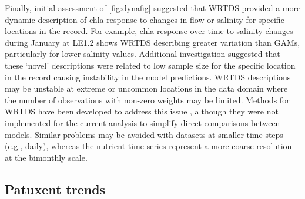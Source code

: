 \documentclass[letterpaper,12pt,oneside]{article}\usepackage[]{graphicx}\usepackage[]{color}
\begin{document}
Finally, initial assessment of \cref{fig:dynafig} suggested that \ac{WRTDS} provided a more dynamic description of \ac{chla} response to changes in flow or salinity for specific locations in the record.  For example, \ac{chla} response over time to salinity changes during January at LE1.2 shows \ac{WRTDS} describing greater variation than \acp{GAM}, particularly for lower salinity values.  Additional investigation suggested that these `novel' descriptions were related to low sample size for the specific location in the record causing instability in the model predictions.   \ac{WRTDS} descriptions may be unstable at extreme or uncommon locations in the data domain where the number of observations with non-zero weights may be limited.  Methods for \ac{WRTDS} have been developed to address this issue \citep[i.e., automated window width increases with low sample sizes,][]{Hirsch10}, although they were not implemented for the current analysis to simplify direct comparisons between models.  Similar problems may be avoided with datasets at smaller time steps (e.g., daily), whereas the nutrient time series represent a more coarse resolution at the bimonthly scale.    

\subsection*{Patuxent trends}
\end{document}
